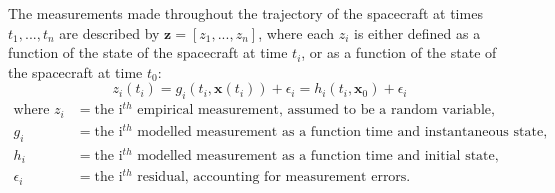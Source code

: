 The measurements made throughout the trajectory of the spacecraft at times
$t_1,...,t_n$ are described by $\bm{z}=[z_1,...,z_n]$, where each $z_i$ is
either defined as a function of the state of the spacecraft at time $t_i$, or
as a function of the state of the spacecraft at time $t_0$:
\begin{equation}
    z_i(t_i) = g_i(t_i, \bm{x}(t_i))+\epsilon_i = h_i(t_i, \bm{x}_0)+\epsilon_i
\end{equation}
\begin{equation*}
    \begin{aligned}
        \textrm{where  }
            z_i &= \text{the i$^{th}$ empirical measurement, assumed to be a random variable,} \\
            g_i &= \text{the i$^{th}$ modelled measurement as a function time and instantaneous state,} \\
            h_i &= \text{the i$^{th}$ modelled measurement as a function time and initial state,} \\
            \epsilon_i &= \text{the i$^{th}$ residual, accounting for measurement errors.} \\
    \end{aligned}
\end{equation*}

